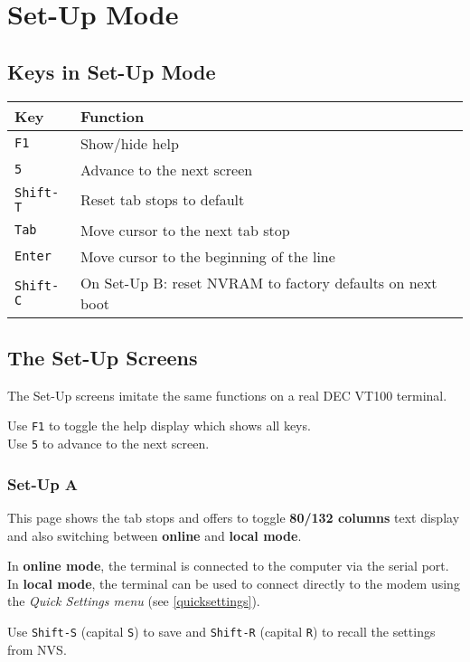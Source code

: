 \chapter{Set-Up Mode}

\section{Keys in Set-Up Mode}

\begin{tabular}{p{6em} | p{}}
\hline
\textbf{Key} & \textbf{Function} \\
\hline
\texttt{F1}			& Show/hide help \\
\texttt{5}          & Advance to the next screen \\
\texttt{Shift-T}	& Reset tab stops to default \\
\texttt{Tab}		& Move cursor to the next tab stop \\
\texttt{Enter}		& Move cursor to the beginning of the line \\
\texttt{Shift-C}	& On Set-Up B: reset NVRAM to factory defaults on next boot \\
\hline
\end{tabular}

\section{The Set-Up Screens}

The Set-Up screens imitate the same functions on a real DEC VT100 terminal.

Use \texttt{F1} to toggle the help display which shows all keys. \\
Use \texttt{5} to advance to the next screen.

\subsection{Set-Up A}

This page shows the tab stops and offers to toggle \textbf{80/132 columns} text display and also switching between
\textbf{online} and \textbf{local mode}.

In \textbf{online mode}, the terminal is connected to the computer via the serial port.\\
In \textbf{local mode}, the terminal can be used to connect directly to the modem using the \textit{Quick Settings menu} (see \vref{quicksettings}).

Use \texttt{Shift-S} (capital \texttt{S}) to save and \texttt{Shift-R} (capital \texttt{R}) to recall the settings from NVS.

